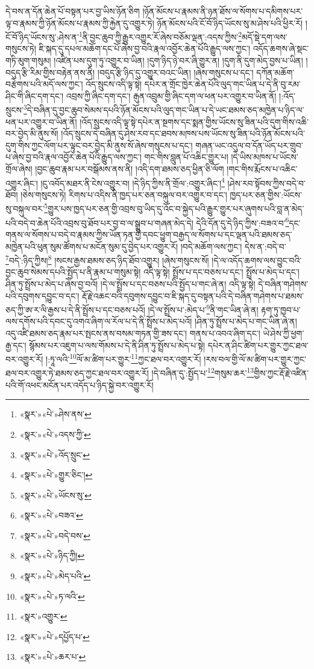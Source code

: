 དེ་བས་ན་དོན་ཆེན་པོ་བསྟན་པར་བྱ་ཡིས་ཉོན་ཅིག །ཉོན་མོངས་པ་རྣམས་ནི་ཉན་ཐོས་ལ་སོགས་པ་དམིགས་པར་ལྟ་བ་རྣམས་ཀྱི་ཉོན་མོངས་པ་རྣམས་ཀྱི་རྐྱེན་དུ་འགྱུར་ཏེ། ཉོན་མོངས་པའི་ངོ་བོ་ཉིད་ཡོངས་སུ་མ་ཤེས་པའི་ཕྱིར་རོ། །ངོ་བོ་ཉིད་ཡོངས་སུ་:ཤེས་ན་\footnote{«སྣར་»«པེ་»ཤེས་ནས་}ནི་བྱང་ཆུབ་ཀྱི་རྒྱུར་འགྱུར་རོ་ཞེས་བཅོམ་ལྡན་:འདས་ཀྱིས་\footnote{«སྣར་»«པེ་»འདས་ཀྱི་}མདོ་སྡེ་དག་ལས་གསུངས་ཏེ། ཇི་སྐད་དུ་དཔལ་མཆོག་དང་པོ་ཞེས་བྱ་བའི་རྣལ་འབྱོར་ཆེན་པོའི་རྒྱུད་ལས་ཀྱང་། འདོད་ཆགས་ཞེ་སྡང་གཏི་མུག་གསུམ། །འཛིན་པས་དུག་ཏུ་འགྱུར་བ་ཡིན། །དུག་ཉིད་ཉེ་བར་ཞི་གྱུར་ན། །དུག་ནི་དུག་མེད་བྱས་པ་ཡིན། །བདུད་རྩི་རིམ་གྱིས་བརྟེན་ནས་ནི། །བདུད་རྩི་ཉིད་དུ་འགྱུར་བའང་ཡིན། །ཞེས་གསུངས་པ་དང་། དཀོན་མཆོག་བརྩེགས་པའི་མདོ་ལས་ཀྱང་། འོད་སྲུངས་འདི་ལྟ་སྟེ། དཔེར་ན་གྲོང་ཁྱེར་ཆེན་པོའི་ལུད་གང་ཡིན་པ་དེ་ནི་བུ་རམ་ཤིང་གི་ཞིང་དག་དང་། འབྲས་ཀྱི་ཞིང་དག་དང་། རྒུན་འབྲུམ་གྱི་ཞིང་དག་ལ་ཕན་པར་འགྱུར་བ་ཡིན་ནོ། །:འོད་སྲུངས་\footnote{«སྣར་»«པེ་»འོད་སྲུང་}དེ་བཞིན་དུ་བྱང་ཆུབ་སེམས་དཔའི་ཉོན་མོངས་པའི་ལུད་གང་ཡིན་པ་དེ་ཡང་ཐམས་ཅད་མཁྱེན་པ་ཉིད་ལ་ཕན་པར་འགྱུར་བ་ཡིན་ནོ། །འོད་སྲུངས་འདི་ལྟ་སྟེ་དཔེར་ན་སྔགས་དང་སྨན་གྱིས་ཡོངས་སུ་ཟིན་པའི་དུག་གིས་འཆི་བར་བྱེད་མི་ནུས་སོ། །འོད་སྲུངས་དེ་བཞིན་དུ་ཤེས་རབ་དང་ཐབས་མཁས་པས་ཡོངས་སུ་ཟིན་པའི་ཉོན་མོངས་པའི་དུག་གིས་ཀྱང་ལོག་པར་ལྟུང་བར་བྱེད་མི་ནུས་སོ་ཞེས་གསུངས་པ་དང་། གཞན་ཡང་འདུལ་བ་དོན་ཡོད་པར་གྲུབ་པ་ཞེས་བྱ་བའི་རྣལ་འབྱོར་ཆེན་པོའི་རྒྱུད་ལས་ཀྱང་། གང་གིས་བླུན་པོ་འཆིང་གྱུར་པ། །དེ་ཡིས་མཁས་པ་ཡོངས་གྲོལ་ཞེས། །བྱང་ཆུབ་རྣམ་པར་བསྒོམས་ནས་ནི། །འདི་དག་ཐམས་ཅད་ཕྱིན་ཅི་ལོག །གང་གིས་རྨོངས་པ་འཆིང་འགྱུར་ཞིང་། །ངུ་འབོད་མཐར་ནི་ངེས་འགྱུར་བ། །དེ་ཉིད་ཀྱིས་ནི་གྲོལ་:འགྱུར་ཞིང་།\footnote{«སྣར་»«པེ་»གྱུར་ཅིང་།} །ཤེས་རབ་སྟོབས་ཀྱིས་བདེ་བ་ཐོབ། །ཅེས་གསུངས་ཏེ། རིགས་པ་འདིས་ནི་ཁྱད་པར་ཅན་བསྐུལ་བར་འགྱུར་བ་དང་། ཁྱད་པར་ཅན་གྱིས་:ཡོངས་སུ་བསྐུལ་བར་\footnote{«སྣར་»«པེ་»ཡོངས་སུ་}གྱུར་པས་ཁྱད་པར་ཅན་གྱི་འབྲས་བུ་ཡིད་དུ་འོང་བ་སྐྱེད་པའི་རྒྱུར་གྱུར་པར་ཞུགས་པའི་བླ་ན་མེད་པའི་བདེ་བ་ཆེན་པོའི་འབྲས་བུ་ཐོབ་པར་བྱ་བ་ལ་སྒྲུབ་པ་གཞན་མེད་དེ། དེའི་དོན་དུ་དེ་ཉིད་ཀྱིས་:བཟའ་བ་\footnote{«སྣར་»«པེ་»བཟའ་}དང་གནས་ལ་སོགས་པ་བདེ་བ་རྣམས་ཀྱིས་ཡོན་ཏན་གྱི་དབང་ཕྱུག་བརྒྱད་ལ་སོགས་པ་དང་ལྡན་པའི་ཐམས་ཅད་མཁྱེན་པའི་ཕུན་སུམ་ཚོགས་པ་མངོན་སུམ་དུ་བྱེད་པར་འགྱུར་རོ། །བདེ་མཆོག་ལས་ཀྱང་། དེས་ན་:བདེ་བ་\footnote{«སྣར་»«པེ་»བདེ་བས་}བདེ་:ཉིད་ཀྱིས།\footnote{«སྣར་»«པེ་»ཉིད་ཀྱི།} །སངས་རྒྱས་ཐམས་ཅད་ཉིད་ཐོབ་འགྱུར། །ཞེས་གསུངས་སོ། །དེ་ལ་འདོད་ཆགས་ལས་བྱུང་བའི་བྱང་ཆུབ་སེམས་དཔའི་སྤྱོད་པ་ནི་རྣམ་པ་གསུམ་སྟེ། འདི་ལྟ་སྟེ། སྤྲོས་པ་དང་བཅས་པ་དང་། སྤྲོས་པ་མེད་པ་དང་། ཤིན་ཏུ་སྤྲོས་པ་མེད་པ་ཞེས་བྱ་བའོ། །དེ་ལ་སྤྲོས་པ་དང་བཅས་པའི་སྤྱོད་པ་གང་ཞེ་ན། འདི་ལྟ་སྟེ། དེ་བཞིན་གཤེགས་པའི་དབུགས་དབྱུང་བ་དང་། རྡོ་རྗེ་འཆང་བའི་དབུགས་དབྱུང་བ་ཇི་སྐད་དུ་བསྟན་པའི་དེ་བཞིན་གཤེགས་པ་ཐམས་ཅད་ཀྱི་ཨ་ར་ལི་རྒྱས་པ་དེ་ནི་སྤྲོས་པ་དང་བཅས་པའོ། །དེ་ལ་སྤྲོས་པ་:མེད་པ་\footnote{«སྣར་»«པེ་»མེད་པའི་}ནི་གང་ཡིན་ཞེ་ན། རྟག་ཏུ་ཁྱབ་པ་ལས་དགོས་པའི་དབང་དུ་འགའ་ཞིག་ལ་རོལ་པ་དེ་ནི་སྤྲོས་པ་མེད་པའོ། །ཤིན་ཏུ་སྤྲོས་པ་མེད་པ་གང་ཡིན་ཞེ་ན། འདུ་འཛི་ཐམས་ཅད་རྣམ་པར་སྤངས་ནས་བསམ་གཏན་གྱི་ཟས་དང་། གནས་པ་འབའ་ཞིག་དང་། ཡེ་ཤེས་ཀྱི་ཕྱག་རྒྱ་དང་། སྙོམས་པར་འཇུག་པ་ལས་གོམས་པ་དེ་ནི་ཤིན་ཏུ་སྤྲོས་པ་མེད་པ་སྟེ། དཔེར་ན་ཤིང་ཚིག་པར་གྱུར་ཀྱང་ཐལ་བར་འགྱུར་རོ། །:ཏཱ་ལའི་\footnote{«སྣར་»«པེ་»ཏ་ལའི་}ལོ་མ་ཚིག་པར་གྱུར་\footnote{«སྣར་»འགྱུར་}ཀྱང་ཐལ་བར་འགྱུར་རོ། །རས་བལ་གྱི་ལོ་མ་ཚིག་པར་གྱུར་ཀྱང་ཐལ་བར་འགྱུར་ཏེ་ཐམས་ཅད་ཀྱང་ཐལ་བར་འགྱུར་རོ། །དེ་བཞིན་དུ་:སྤྱོད་པ་\footnote{«སྣར་»«པེ་»དཔྱོད་པ་}གསུམ་ཆར་\footnote{«སྣར་»«པེ་»ཆར་པ་}གྱིས་ཀྱང་རྡོ་རྗེ་འཛིན་པའི་གོ་འཕང་མངོན་པར་འདོད་པ་ཉིད་སྐྱེ་བར་འགྱུར་རོ། 